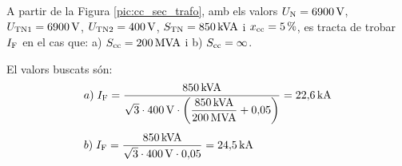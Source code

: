 \begin{exemple}
A partir de la Figura \vref{pic:cc_sec_trafo}, amb els valors
$U_\mathrm{N}=6900\mathrm{\,V}$, $U_\mathrm{TN1}=6900\mathrm{\,V}$,
$U_\mathrm{TN2}=400\mathrm{\,V}$, $S_\mathrm{TN}=850\mathrm{\,kVA}$ i
$x_\mathrm{cc}=5\mathrm{\,\%}$, es tracta de trobar $I_\mathrm{F}$ en el cas
que: a) $S_\mathrm{cc}=200\mathrm{\,MVA}$ i b) $S_\mathrm{cc}=\infty$.

El valors buscats s\'{o}n:
\begin{align*}
   &a)\;I_\mathrm{F} = \frac{850\mathrm{\,kVA}}{\sqrt{3}\cdot 400\mathrm{\,V}\cdot
   \left(\dfrac{850\mathrm{\,kVA}}{200\mathrm{\,MVA}} +
   0{,}05\right)} = 22{,}6\mathrm{\,kA} \\[1ex]
   &b)\;I_\mathrm{F} = \frac{850\mathrm{\,kVA}}{\sqrt{3}\cdot 400\mathrm{\,V}\cdot
   0{,}05} = 24{,}5\mathrm{\,kA}
\end{align*}

\end{exemple}
